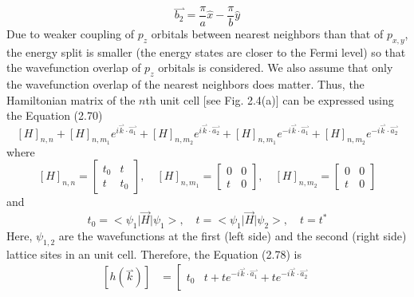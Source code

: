 \begin{equation}
    \overset{\rightharpoonup}{b_{2}} = \frac{\pi}{a}\hat{x} - \frac{\pi}{b}\hat{y}
\end{equation} Due to weaker coupling of $p_{z}$ orbitals between nearest neighbors than that of $p_{x,y}$, the energy split is smaller (the energy states are closer to the Fermi level) so that the wavefunction overlap of $p_{z}$ orbitals is considered. We also assume that only the wavefunction overlap of the nearest neighbors does matter. Thus, the Hamiltonian matrix of the $n$th unit cell [see Fig. 2.4(a)] can be expressed using the Equation (2.70) \begin{equation}
    \left[H\right]_{n,n} + \left[H\right]_{n,m_{1}}e^{i\overset{\rightharpoonup}{k}\cdot\overset{\rightharpoonup}{a_{1}}} + \left[H\right]_{n,m_{2}}e^{i\overset{\rightharpoonup}{k}\cdot\overset{\rightharpoonup}{a_{2}}} + \left[H\right]_{n,m_{1}}e^{-i\overset{\rightharpoonup}{k}\cdot\overset{\rightharpoonup}{a_{1}}} + \left[H\right]_{n,m_{2}}e^{-i\overset{\rightharpoonup}{k}\cdot\overset{\rightharpoonup}{a_{2}}}
\end{equation} where \begin{equation}
    \left[H\right]_{n,n} = \left[ \begin{matrix}
    t_{0} & t \\
    t & t_{0}
    \end{matrix}
    \right],\quad
    \left[H\right]_{n,m_{1}} = \left[ \begin{matrix}
    0 & 0 \\
    t & 0
    \end{matrix}
    \right],\quad
    \left[H\right]_{n,m_{2}} = \left[ \begin{matrix}
    0 & 0 \\
    t & 0
    \end{matrix}
    \right]
\end{equation} and \begin{equation}
    t_{0} = \big<\psi_{1}\big|\vec{H}\big|\psi_{1}\big>,\quad t = \big<\psi_{1}\big|\vec{H}\big|\psi_{2}\big>,\quad t = t^{*}
\end{equation} Here, $\psi_{1,2}$ are the wavefunctions at the first (left side) and the second (right side) lattice sites in an unit cell. Therefore, the Equation (2.78) is \begin{align}
    \left[h(\overset{\rightharpoonup}{k})\right]& = \left[\begin{matrix}
    t_{0} & t + te^{-i\overset{\rightharpoonup}{k}\cdot\overset{\rightharpoonup}{a_{1}}} + te^{-i\overset{\rightharpoonup}{k}\cdot\overset{\rightharpoonup}{a_{2}}} \\

\end{matrix}
\end{align}
